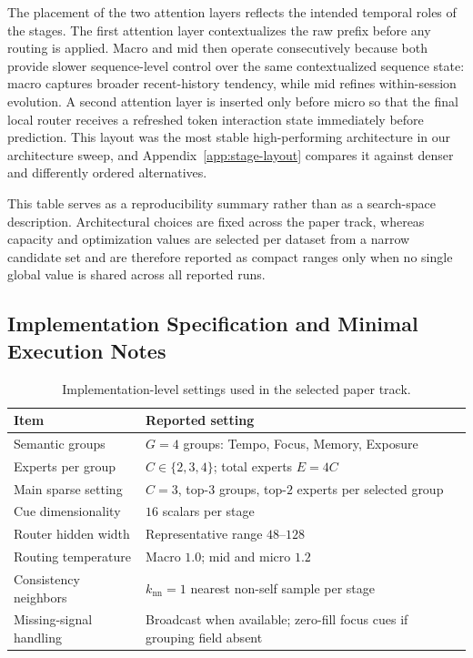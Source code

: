 \documentclass[sigconf,review,anonymous]{acmart}
\begin{document}
The placement of the two attention layers reflects the intended temporal roles of the stages. The first attention layer contextualizes the raw prefix before any routing is applied. Macro and mid then operate consecutively because both provide slower sequence-level control over the same contextualized sequence state: macro captures broader recent-history tendency, while mid refines within-session evolution. A second attention layer is inserted only before micro so that the final local router receives a refreshed token interaction state immediately before prediction. This layout was the most stable high-performing architecture in our architecture sweep, and Appendix~\ref{app:stage-layout} compares it against denser and differently ordered alternatives.

This table serves as a reproducibility summary rather than as a search-space description. Architectural choices are fixed across the paper track, whereas capacity and optimization values are selected per dataset from a narrow candidate set and are therefore reported as compact ranges only when no single global value is shared across all reported runs.

\subsection{Implementation Specification and Minimal Execution Notes}

\begin{table}[H]
  \centering
  \caption{Implementation-level settings used in the selected paper track.}
  \label{tab:appendix-implementation-spec}
  \footnotesize
  \setlength{\tabcolsep}{4pt}
  \renewcommand{\arraystretch}{1.07}
  \begin{tabularx}{\columnwidth}{@{}L{0.30\columnwidth}>{\raggedright\arraybackslash}X@{}}
    \toprule
    Item & Reported setting \\
    \midrule
    Semantic groups & $G=4$ groups: Tempo, Focus, Memory, Exposure \\
    Experts per group & $C\in\{2,3,4\}$; total experts $E=4C$ \\
    Main sparse setting & $C=3$, top-$3$ groups, top-$2$ experts per selected group \\
    Cue dimensionality & $16$ scalars per stage \\
    Router hidden width & Representative range $48$--$128$ \\
    Routing temperature & Macro $1.0$; mid and micro $1.2$ \\
    Consistency neighbors & $k_{\mathrm{nn}}=1$ nearest non-self sample per stage \\
    Missing-signal handling & Broadcast when available; zero-fill focus cues if grouping field absent \\
    \bottomrule
  \end{tabularx}
\end{table}
\end{document}
